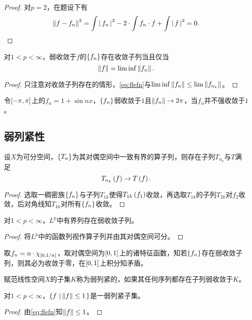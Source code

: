 \documentclass{ctexrep}
\begin{document}
  \begin{proof}
  对$p=2$，在题设下有
  \[ \left\| f-f_n \right\|^2 = \int \left|\, f_n \,\right|^2-2\cdot\int f_n\cdot f+\int\left|\, f \,\right|^2 = 0. \qedhere \]
  \end{proof}
  \begin{collary}
  对$1<p<\infty$，弱收敛于$f$的$\left\{f_n\right\}$存在收敛子列当且仅当
  \[ \left\| f \right\| = \lim\inf\left\| f_n \right\|. \]
  \end{collary}
  \begin{proof}
  只注意对收敛子列存在的情形，\eqref{eq:flefn}与$\lim\inf\left\| f_n \right\|\le\lim\left\| f_{n_k} \right\|$。
  \end{proof}
  \begin{ex}
  令$\left[-\pi,\pi\right]$上的$f_n=1+\sin nx$，$\left\{f_n\right\}$弱收敛于$1$且$\left\| f_n \right\|\rightarrow 2\pi$，当$f_n$并不强收敛于$1$。
  \end{ex}
  \subsection{弱列紧性}
  \begin{theorem}[Helley]
  设$X$为可分空间，$\left\{T_n\right\}$为其对偶空间中一致有界的算子列，则存在子列$T_{n_k}$与$T$满足
  \[ T_{n_k}\left(f\right) \rightarrow T\left(f\right). \]
  \end{theorem}
  \begin{proof}
  选取一稠密族$\left\{f_n\right\}$与子列$T_{1k}$使得$T_{1k}\left(f_1\right)$收敛，再选取$T_{1k}$的子列$T_{2k}$对$f_2$收敛，后对角线知$T_{kk}$对所有$\left\{f_n\right\}$收敛。
  \end{proof}
  \begin{theorem}
  对$1<p<\infty$，$L^p$中有界列存在弱收敛子列。
  \end{theorem}
  \begin{proof}
  将$L^p$中的函数列视作算子列并由其对偶空间可分。
  \end{proof}
  \begin{ex}
  取$f_n=n\cdot\chi_{\left[0,1/n\right]}$，取对偶空间为$\left[0,1\right]$上的诸特征函数，知若$\left\{f_n\right\}$存在弱收敛子列，则其必为收敛于零，在$\left[0,1\right]$上积分知矛盾。
  \end{ex}
  \begin{definition}
  赋范线性空间$X$的子集$K$称为弱列紧的，如果其任何序列都存在子列弱收敛于$K$。
  \end{definition}
  \begin{theorem}
  对$1<p<\infty$，$\left\{f \, \left| \, \left\| f \right\|\le1 \right.\right\}$是一弱列紧子集。
  \end{theorem}
  \begin{proof}
  由\eqref{eq:flefn}知$\left\| f \right\|\le 1$。
  \end{proof}
\end{document}
